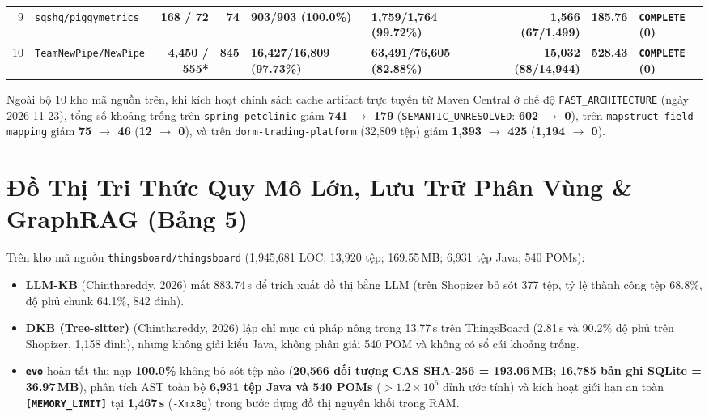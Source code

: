 \documentclass[10pt,a4paper]{article}
\begin{document}
\begin{table}[htbp]
\begin{tabularx}{\textwidth}{r >{\raggedright\arraybackslash}p{3.0cm} r r >{\raggedright\arraybackslash}p{2.3cm} >{\raggedright\arraybackslash}p{2.2cm} r r >{\raggedright\arraybackslash}p{2.5cm}}
9 & \texttt{sqshq/piggymetrics} & \textbf{168 / 72} & \textbf{74} & \textbf{903/903 (100.0\%)} & \textbf{1,759/1,764 (99.72\%)} & \textbf{1,566 (67/1,499)} & \textbf{185.76} & \textbf{\texttt{COMPLETE} (0)} \\
10 & \texttt{TeamNewPipe/NewPipe} & \textbf{4,450 / 555*} & \textbf{845} & \textbf{16,427/16,809 (97.73\%)} & \textbf{63,491/76,605 (82.88\%)} & \textbf{15,032 (88/14,944)} & \textbf{528.43} & \textbf{\texttt{COMPLETE} (0)} \\
\bottomrule
\end{tabularx}
\end{table}

Ngoài bộ 10 kho mã nguồn trên, khi kích hoạt chính sách cache artifact trực tuyến từ Maven Central ở chế độ \texttt{FAST\_ARCHITECTURE} (ngày 2026-11-23), tổng số khoảng trống trên \texttt{spring-petclinic} giảm \textbf{741 $\rightarrow$ 179} (\texttt{SEMANTIC\_UNRESOLVED}: \textbf{602 $\rightarrow$ 0}), trên \texttt{mapstruct-field-mapping} giảm \textbf{75 $\rightarrow$ 46} (\textbf{12 $\rightarrow$ 0}), và trên \texttt{dorm-trading-platform} (32,809 tệp) giảm \textbf{1,393 $\rightarrow$ 425} (\textbf{1,194 $\rightarrow$ 0}).

\section{Đồ Thị Tri Thức Quy Mô Lớn, Lưu Trữ Phân Vùng & GraphRAG (Bảng 5)}

Trên kho mã nguồn \texttt{thingsboard/thingsboard} (1,945,681 LOC; 13,920 tệp; 169.55\,MB; 6,931 tệp Java; 540 POMs):
\begin{itemize}
    \item \textbf{LLM-KB} (Chinthareddy, 2026) \cite{chinthareddy2026reliable} mất 883.74\,s để trích xuất đồ thị bằng LLM (trên Shopizer bỏ sót 377 tệp, tỷ lệ thành công tệp 68.8\%, độ phủ chunk 64.1\%, 842 đỉnh).
    \item \textbf{DKB (Tree-sitter)} (Chinthareddy, 2026) \cite{chinthareddy2026reliable} lập chỉ mục cú pháp nông trong 13.77\,s trên ThingsBoard (2.81\,s và 90.2\% độ phủ trên Shopizer, 1,158 đỉnh), nhưng không giải kiểu Java, không phân giải 540 POM và không có sổ cái khoảng trống.
    \item \textbf{\texttt{evo}} hoàn tất thu nạp \textbf{100.0\%} không bỏ sót tệp nào (\textbf{20,566 đối tượng CAS SHA-256 = 193.06\,MB}; \textbf{16,785 bản ghi SQLite = 36.97\,MB}), phân tích AST toàn bộ \textbf{6,931 tệp Java và 540 POMs} ($>1.2\times 10^6$ đỉnh ước tính) và kích hoạt giới hạn an toàn \textbf{\texttt{[MEMORY\_LIMIT]}} tại \textbf{1,467\,s} (\texttt{-Xmx8g}) trong bước dựng đồ thị nguyên khối trong RAM.
\end{itemize}
\end{document}
